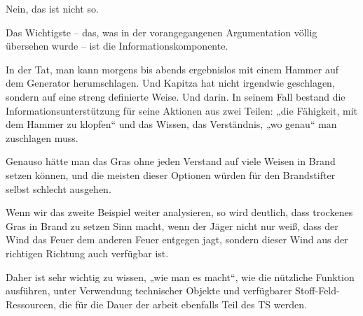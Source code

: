 \documentclass[11pt,a4paper]{article}
\begin{document}
Nein, das ist nicht so.

Das Wichtigste -- das, was in der vorangegangenen Argumentation völlig
übersehen wurde -- ist die Informationskomponente.

In der Tat, man kann morgens bis abends ergebnislos mit einem Hammer auf dem
Generator herumschlagen. Und Kapitza hat nicht irgendwie geschlagen, sondern
auf eine streng definierte Weise. Und darin.  In seinem Fall bestand die
Informationsunterstützung für seine Aktionen aus zwei Teilen: „die Fähigkeit,
mit dem Hammer zu klopfen“ und das Wissen, das Verständnis, „wo genau“ man
zuschlagen muss.

Genauso hätte man das Gras ohne jeden Verstand auf viele Weisen in Brand
setzen können, und die meisten dieser Optionen würden für den Brandstifter
selbst schlecht ausgehen.

Wenn wir das zweite Beispiel weiter analysieren, so wird deutlich, dass
trockenes Gras in Brand zu setzen Sinn macht, wenn der Jäger nicht nur weiß,
dass der Wind das Feuer dem anderen Feuer entgegen jagt, sondern dieser Wind
aus der richtigen Richtung auch verfügbar ist.

Daher ist sehr wichtig zu wissen, „wie man es macht“, wie die nützliche
Funktion ausführen, unter Verwendung technischer Objekte und verfügbarer
Stoff-Feld-Ressourcen, die für die Dauer der arbeit ebenfalls Teil des TS
werden.
\end{document}
